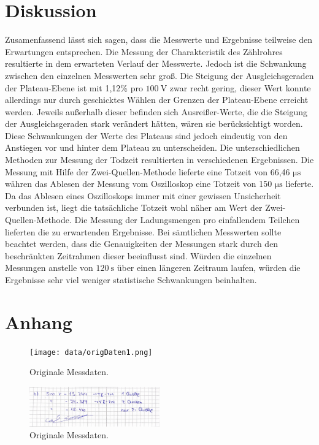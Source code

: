\section{Diskussion}
\label{sec:Diskussion}

Zusamenfassend lässt sich sagen, dass die Messwerte und Ergebnisse teilweise den Erwartungen entsprechen.
\newline
Die Messung der Charakteristik des Zählrohres resultierte in dem erwarteten Verlauf der Messwerte. Jedoch ist die Schwankung zwischen den einzelnen Messwerten sehr groß.
Die Steigung der Ausgleichsgeraden der Plateau-Ebene ist mit 1,12\% pro $\SI{100}{\volt}$ zwar recht gering, dieser Wert konnte allerdings nur durch geschicktes Wählen der
Grenzen der Plateau-Ebene erreicht werden. Jeweils außerhalb dieser befinden sich Ausreißer-Werte, die die Steigung der Ausgleichsgeraden stark verändert hätten, wären sie
berücksichtigt worden. Diese Schwankungen der Werte des Plateaus sind jedoch eindeutig von den Anstiegen vor und hinter dem Plateau zu unterscheiden.
\newline
Die unterschiedlichen Methoden zur Messung der Todzeit resultierten in verschiedenen Ergebnissen. Die Messung mit Hilfe der Zwei-Quellen-Methode lieferte eine Totzeit von
66,46 $\si{\micro\second}$ währen das Ablesen der Messung vom Oszilloskop eine Totzeit von 150 $\si{\micro\second}$ lieferte. Da das Ablesen eines Oszilloskops immer mit
einer gewissen Unsicherheit verbunden ist, liegt die tatsächliche Totzeit wohl näher am Wert der Zwei-Quellen-Methode.
\newline
Die Messung der Ladungsmengen pro einfallendem Teilchen lieferten die zu erwartenden Ergebnisse.
\newline
Bei sämtlichen Messwerten sollte beachtet werden, dass die Genauigkeiten der Messungen stark durch den beschränkten Zeitrahmen dieser beeinflusst sind. Würden die
einzelnen Messungen anstelle von $\SI{120}{\second}$ über einen längeren Zeitraum laufen, würden die Ergebnisse sehr viel weniger statistische Schwankungen beinhalten.

\printbibliography{}

\section*{Anhang}
\label{sec:anhang}

\begin{figure}[H]
    \centering
    \texttt{[image: data/origDaten1.png]}
    \caption{Originale Messdaten.}
    \label{fig:origDaten1}
\end{figure}

\begin{figure}[H]
    \centering
    \includegraphics[width=0.5\textwidth]{data/origDaten2.png}
    \caption{Originale Messdaten.}
    \label{fig:origDaten2}
\end{figure}